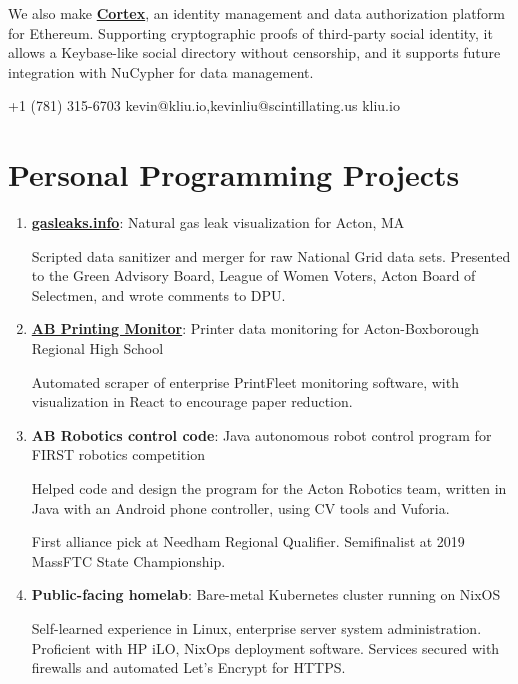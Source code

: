 \documentclass[paper=letter]{tccv}
\begin{document}
We also make \href{https://mycortex.tech}{\textbf{Cortex}}, an identity management and data authorization platform for Ethereum. Supporting cryptographic proofs of third-party social identity, it allows a Keybase-like social directory without censorship, and it supports future integration with NuCypher for data management.

    {+1 (781) 315-6703}
    {kevin@kliu.io,kevinliu@scintillating.us}
    {kliu.io}

\section{Personal Programming Projects}

\begin{enumerate}
    \item \textbf{\href{https://gasleaks.info}{gasleaks.info}}: Natural gas leak visualization for Acton, MA
    
    Scripted data sanitizer and merger for raw National Grid data sets. Presented to the Green Advisory Board, League of Women Voters, Acton Board of Selectmen, and wrote comments to DPU.

    \item \textbf{\href{https://ab-printing.netlify.com/}{AB Printing Monitor}}: Printer data monitoring for Acton-Boxborough Regional High School
    
    Automated scraper of enterprise PrintFleet monitoring software, with visualization in React to encourage paper reduction.

    \item \textbf{AB Robotics control code}: Java autonomous robot control program for FIRST robotics competition
        
    Helped code and design the program for the Acton Robotics team, written in Java with an Android phone controller, using CV tools and Vuforia.

    First alliance pick at Needham Regional Qualifier. Semifinalist at 2019 MassFTC State Championship.
     
    \item \textbf{Public-facing homelab}: Bare-metal Kubernetes cluster running on NixOS

    Self-learned experience in Linux, enterprise server system administration. Proficient with HP iLO, NixOps deployment software. Services secured with firewalls and automated Let's Encrypt for HTTPS.
     
\end{enumerate}
\end{document}

